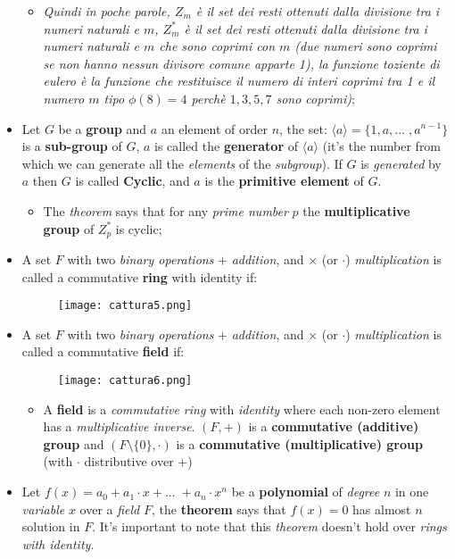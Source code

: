 \documentclass{article}
\begin{document}
\begin{itemize}
\begin{itemize}
\begin{itemize}
\end{itemize}
\item \emph{Quindi in poche parole, $Z_m$ è il set dei resti ottenuti dalla divisione tra i numeri naturali e $m$, $Z_m^{*}$ è il set dei resti ottenuti dalla divisione tra i numeri naturali e $m$ che sono coprimi con $m$ (due numeri sono coprimi se non hanno nessun divisore comune apparte 1), 
la funzione toziente di eulero è la funzione che restituisce il numero di interi coprimi tra 1 e il numero $m$ tipo $\phi(8)=4$ perchè $1,3,5,7$ sono coprimi)};
\end{itemize}
\item Let $G$ be a \textbf{group} and $a$ an element of order $n$, the set: $ \langle a \rangle = \{ 1,a,...\;,a^{n-1} \}$ is a \textbf{sub-group} of $G$, $a$ is called the \textbf{generator} of $\langle a \rangle$ (it's the number from which we can generate all the \emph{elements} of the \emph{subgroup}). If $G$ is \emph{generated} by $a$ then $G$ is called \textbf{Cyclic}, and $a$ is the \textbf{primitive element} of $G$. 
\begin{itemize}
\item The \emph{theorem} says that for any \emph{prime number} $p$ the \textbf{multiplicative group} of $Z_p^*$ is cyclic; 
\end{itemize}
\item A set $F$ with two \emph{binary operations} $+$ \emph{addition}, and $\times$ (or $\cdot$) \emph{multiplication} is called a commutative \textbf{ring} with identity if:
\begin{figure}[H]
  \centering
  \texttt{[image: cattura5.png]}
\end{figure}
\item A set $F$ with two \emph{binary operations} $+$ \emph{addition}, and $\times$ (or $\cdot$) \emph{multiplication} is called a commutative \textbf{field} if:
\begin{figure}[H]
  \centering
  \texttt{[image: cattura6.png]}
\end{figure}
\begin{itemize}
\item A \textbf{field} is a \emph{commutative ring} with \emph{identity} where each non-zero element has a \emph{multiplicative inverse}. $(F,+)$ is a \textbf{commutative (additive) group} and $(F \setminus \{0\}, \cdot)$ is a \textbf{commutative (multiplicative) group} (with $\cdot$ distributive over $+$)
\end{itemize}
\item Let $f(x) = a_0 + a_1 \cdot x + ...\; + a_n \cdot x^n$ be a \textbf{polynomial} of \emph{degree} $n$ in one \emph{variable} $x$ over a \emph{field} $F$, the \textbf{theorem} says that $f(x) = 0$ has almost $n$ solution in $F$. It's important to note that this \emph{theorem} doesn't hold over \emph{rings with identity}. 

\end{itemize}
\end{document}
